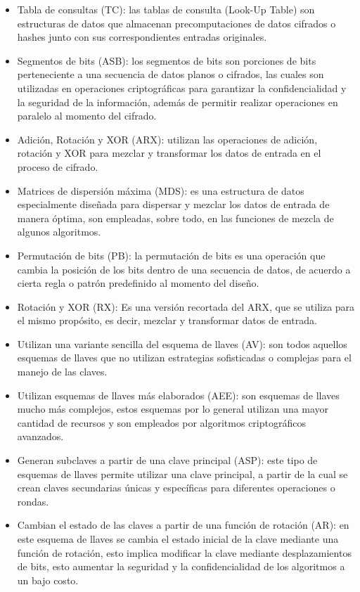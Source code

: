 \documentclass[a4paper,10pt]{article}
\begin{document}
	\begin{itemize}
		\item Tabla de consultas (TC): las tablas de consulta (Look-Up Table) son estructuras de datos que almacenan precomputaciones de datos cifrados o hashes junto con sus correspondientes entradas originales.
		\item Segmentos de bits (ASB): los segmentos de bits son porciones de bits perteneciente a una secuencia de datos planos o cifrados, las cuales son utilizadas en operaciones criptográficas para garantizar la confidencialidad y la seguridad de la información, además de permitir realizar operaciones en paralelo al momento del cifrado.
		\item Adición, Rotación y XOR (ARX): utilizan las operaciones de adición, rotación y XOR para mezclar y transformar los datos de entrada en el proceso de cifrado.
		\item Matrices de dispersión máxima (MDS): es una estructura de datos especialmente diseñada para dispersar y mezclar los datos de entrada de manera óptima, son empleadas, sobre todo, en las funciones de mezcla de algunos algoritmos.
		\item Permutación de bits (PB): la permutación de bits es una operación que cambia la posición de los bits dentro de una secuencia de datos, de acuerdo a cierta regla o patrón predefinido al momento del diseño.
		\item Rotación y XOR (RX): Es una versión recortada del ARX, que se utiliza para el mismo propósito, es decir, mezclar y transformar datos de entrada.
		\item Utilizan una variante sencilla del esquema de llaves (AV): son todos aquellos esquemas de llaves que no utilizan estrategias sofisticadas o complejas para el manejo de las claves.
		\item Utilizan esquemas de llaves más elaborados (AEE): son esquemas de llaves mucho más complejos, estos esquemas por lo general utilizan una mayor cantidad de recursos y son empleados por algoritmos criptográficos avanzados.
		\item Generan subclaves a partir de una clave principal (ASP): este tipo de esquemas de llaves permite utilizar una clave principal, a partir de la cual se crean claves secundarias únicas y específicas para diferentes operaciones o rondas.
		\item Cambian el estado de las claves a partir de una función de rotación (AR): en este esquema de llaves se cambia el estado inicial de la clave mediante una función de rotación, esto implica modificar la clave mediante desplazamientos de bits, esto aumentar la seguridad y la confidencialidad de los algoritmos a un bajo costo.
	\end{itemize}
\end{document}
